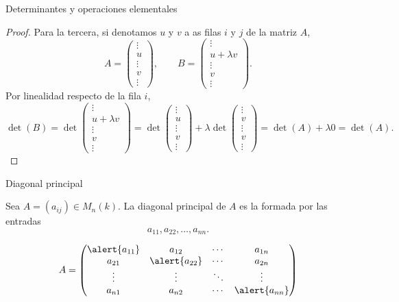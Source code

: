 \begin{frame}[allowframebreaks, t]{Determinantes y operaciones elementales}
\begin{proof}
Para la tercera, si denotamos $u$ y $v$ a as filas $i$ y $j$ de la matriz $A$,
\[
A=
\left(
\begin{array}{c}
\vdots\\
\hline
u\\
\hline
\vdots\\
\hline
v\\
\hline
\vdots
\end{array}
\right),
\qquad
B=
\left(
\begin{array}{c}
\vdots\\
\hline
u+\lambda v\\
\hline
\vdots\\
\hline
v\\
\hline
\vdots
\end{array}
\right).
\]
Por linealidad respecto de la fila \(i\),
\[
\det(B)
=
\det
\left(
\begin{array}{c}
\vdots\\
\hline
u+\lambda v\\
\hline
\vdots\\
\hline
v\\
\hline
\vdots
\end{array}
\right)
=
\det
\left(
\begin{array}{c}
\vdots\\
\hline
u\\
\hline
\vdots\\
\hline
v\\
\hline
\vdots
\end{array}
\right)
+
\lambda
\det
\left(
\begin{array}{c}
\vdots\\
\hline
v\\
\hline
\vdots\\
\hline
v\\
\hline
\vdots
\end{array}
\right)
=
\det(A)+ \lambda 0
=
\det(A).
\]
\end{proof}

\end{frame}


\begin{frame}{Diagonal principal}

\begin{definition}
Sea \(A=(a_{ij})\in M_n(k)\). La \alert{diagonal principal} de \(A\)
es la formada por las entradas
\[
a_{11},a_{22},\ldots,a_{nn}.
\]
\end{definition}

\[
A=
\begin{pmatrix}
\alert{a_{11}} & a_{12} & \cdots & a_{1n}\\
a_{21} & \alert{a_{22}} & \cdots & a_{2n}\\
\vdots & \vdots & \ddots & \vdots\\
a_{n1} & a_{n2} & \cdots & \alert{a_{nn}}
\end{pmatrix}
\]

\end{frame}

